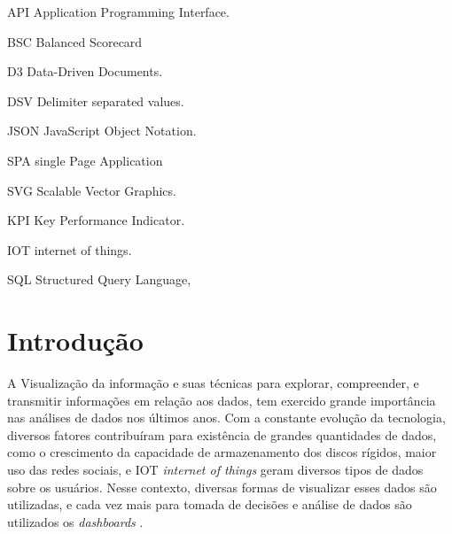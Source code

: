 \documentclass[
	12pt,				%
	openright,			%
	oneside,			%
	a4paper,			%
	english,			%
	brazil				%
	]{abntex2}
\begin{document}
\cleardoublepage

\begin{siglas}
  \item [API] Application Programming Interface.
  \item [BSC] Balanced Scorecard
  \item [D3]   Data-Driven Documents.
  \item [DSV]  Delimiter separated values.
  \item [JSON] JavaScript Object Notation.
  \item [SPA] single Page Application
  \item [SVG] Scalable Vector Graphics.
  \item [KPI] Key Performance Indicator.
  \item [IOT] internet of things.
  \item [SQL] Structured Query Language,
\end{siglas}


\tableofcontents*
\cleardoublepage



\textual


\chapter{Introdução}
\label{ch:introduca}

A Visualização da informação e suas técnicas para explorar, compreender, e transmitir informações em relação aos dados, tem exercido grande importância nas análises de dados nos últimos anos. Com a constante evolução da tecnologia, diversos fatores contribuíram para existência de grandes quantidades de dados, como o crescimento da capacidade de armazenamento dos discos rígidos, maior uso das redes sociais, e IOT \textit{internet of things} geram diversos tipos de dados sobre os usuários. Nesse contexto, diversas formas de visualizar esses dados são utilizadas, e cada vez mais para tomada de decisões e análise de dados são utilizados os \textit{dashboards} \cite{Yesudas}. 
\end{document}
